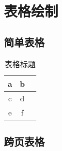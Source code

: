 \chapter{表格绘制}

\section{简单表格}

\begin{table}[htbp]
  \centering
  \caption{表格标题}\label{tab:simpletable}
  \begin{tabular}{ccc}
    \hline
    a & b \\ %
    \hline
    c & d \\
    e & f \\
    \hline
  \end{tabular}
\end{table}

\section{跨页表格}

